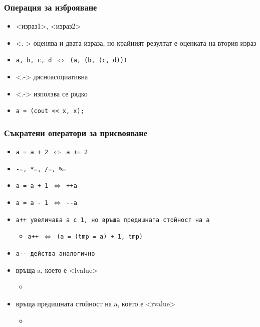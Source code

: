 \documentclass{beamer}
\begin{document}
\begin{frame}
  \frametitle{Операция за изброяване}

  \begin{itemize}[<+->]
  \item{} <израз1>\tta, <израз2>
  \item<.-> оценява и двата израза, но крайният резултат е оценката на втория израз
  \item \tt{a, b, c, d} $\Leftrightarrow$ \tt{(a, (b, (c, d)))}
  \item<.-> \alert{дясноасоциативна}
  \item<.-> използва се рядко
  \item \exa \lstinline{a = (cout << x, x);}
  \end{itemize}
\end{frame}

\begin{frame}
  \frametitle{Съкратени оператори за присвояване}

  \begin{itemize}[<+->]
  \item \tt{a = a + 2} $\Leftrightarrow$ \tt{a += 2}
  \item \tt{-=}, \tt{*=}, \tt{/=}, \tt{\%=}
  \item \tt{a = a + 1}  $\Leftrightarrow$ \tt{++a}
  \item \tt{a = a - 1}  $\Leftrightarrow$ \tt{-{}-a}
  \item \tt{a++} увеличава a с 1, но връща предишната стойност на \tt a
    \begin{itemize}
    \item \tt{a++} $\Leftrightarrow$ \tt{(a = (tmp = a) + 1, tmp)}
    \end{itemize}
  \item \tt{a-{}-} действа аналогично
  \item {} връща a, което е \alert{<lvalue>}
    \begin{itemize}
    \item \exa {}
    \end{itemize}
  \item {} връща предишната стойност на a, което е \alert{<rvalue>}
    \begin{itemize}
    \item \exa {} 
    \end{itemize}
  \end{itemize}
\end{frame}
\end{document}

